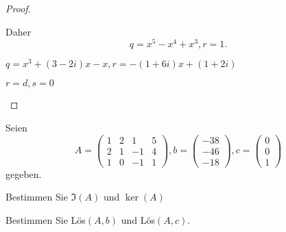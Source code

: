 \begin{proof}
	\begin{parts}
	\item 

		Daher
		\[
		q=x^5-x^4+x^3, r=1
		.\]
	\item $q=x^3+(3-2i)x-x, r=-(1+6i)x+(1+2i)$
	\item $r=d, s=0$
	\end{parts}
\end{proof}

\begin{Problem}
	Seien
	\[A=\begin{pmatrix} 1 & 2 & 1 & 5 \\ 2 & 1 & -1 & 4 \\ 1 & 0 & -1 & 1 \end{pmatrix}, b=\begin{pmatrix} -38 \\ -46 \\ -18 \end{pmatrix} , c=\begin{pmatrix} 0 \\ 0 \\ 1 \end{pmatrix}  \]
	gegeben.
	\begin{parts}
	\item Bestimmen Sie $\Im(A)$ und $\ker(A)$ 
	\item Bestimmen Sie L\"{o}s$(A, b)$ und L\"{o}s$(A, c)$.
	\end{parts}
\end{Problem}
